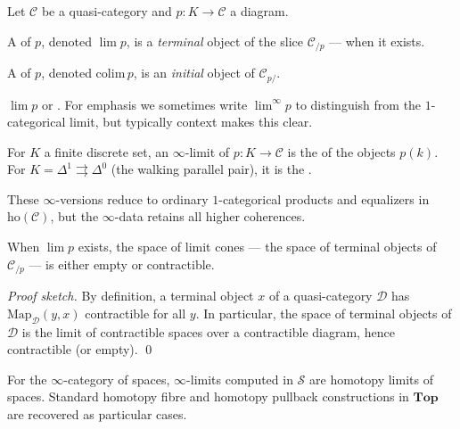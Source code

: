 \begin{definition}
\label{def:limit-colimit-qcat}
Let $\mathcal{C}$ be a quasi-category and $p : K \to \mathcal{C}$ a
diagram.

A  of $p$, denoted $\lim p$, is a \emph{terminal} object of
the slice $\mathcal{C}_{/p}$ — when it exists.

A  of $p$, denoted $\mathrm{colim}\, p$, is an
\emph{initial} object of $\mathcal{C}_{p/}$.
\end{definition}

\begin{howtosay}
$\lim p$  or .
For emphasis we sometimes write $\lim^\infty p$ to distinguish from the
$1$-categorical limit, but typically context makes this clear.
\end{howtosay}

\begin{example_thm}
\label{ex:products-equalizers-qcat}
For $K$ a finite discrete set, an $\infty$-limit of $p : K \to \mathcal{C}$
is the  of the objects $p(k)$. For $K = \Delta^1
\rightrightarrows \Delta^0$ (the walking parallel pair), it is the
.

These $\infty$-versions reduce to ordinary $1$-categorical products and
equalizers in $\mathrm{ho}(\mathcal{C})$, but the $\infty$-data retains
all higher coherences.
\end{example_thm}

\begin{theorem}
\label{thm:uniqueness}
When $\lim p$ exists, the space of limit cones — the space of terminal
objects of $\mathcal{C}_{/p}$ — is either empty or contractible.
\end{theorem}

\begin{proof}[Proof sketch]
By definition, a terminal object $x$ of a quasi-category $\mathcal{D}$ has
$\mathrm{Map}_\mathcal{D}(y, x)$ contractible for all $y$. In particular,
the space of terminal objects of $\mathcal{D}$ is the limit of
contractible spaces over a contractible diagram, hence contractible (or
empty). \qed
\end{proof}

\begin{remark}
For the $\infty$-category of spaces, $\infty$-limits computed in
$\mathcal{S}$ are homotopy limits of spaces. Standard homotopy fibre and
homotopy pullback constructions in $\mathbf{Top}$ are recovered as
particular cases.
\end{remark}


